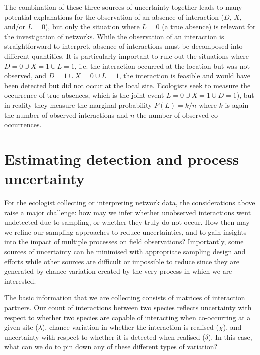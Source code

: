 \documentclass[12pt]{article}
\begin{document}

    The combination of these three sources of uncertainty together leads to many potential explanations for the observation of an absence of interaction ($D$, $X$, and/or $L = 0$), but only the situation where $L = 0$ (a true absence) is relevant for the investigation of networks. While the observation of an interaction is straightforward to interpret, absence of interactions must be decomposed into different quantities. It is particularly important to rule out the situations where $D=0 \cup X = 1 \cup L=1$, i.e. the interaction occurred at the location but was not observed, and $D=1 \cup X = 0 \cup L =1$, the interaction is feasible and would have been detected but did not occur at the local site. Ecologists seek to measure the occurrence of true absences, which is the joint event $L=0 \cup X=1 \cup D=1$), but in reality they measure the marginal probability $P(L) = k/n$ where $k$ is again the number of observed interactions and $n$ the number of observed co-occurrences.


\section*{Estimating detection and process uncertainty}

  For the ecologist collecting or interpreting network data, the considerations above raise a major challenge: how may we infer whether unobserved interactions went undetected due to sampling, or whether they truly do not occur. How then may we refine our sampling approaches to reduce uncertainties, and to gain insights into the impact of multiple processes on field observations? Importantly, some sources of uncertainty can be minimised with appropriate sampling design and efforts while other sources are difficult or impossible to reduce since they are generated by chance variation created by the very process in which we are interested.


  The basic information that we are collecting consists of matrices of interaction partners. Our count of interactions between two species reflects uncertainty with respect to whether two species are capable of interacting when co-occurring at a given site ($\lambda$), chance variation in whether the interaction is realised ($\chi$),  and uncertainty with respect to whether it is detected when realised ($\delta$). In this case, what can we do to pin down any of these different types of variation?
\end{document}

